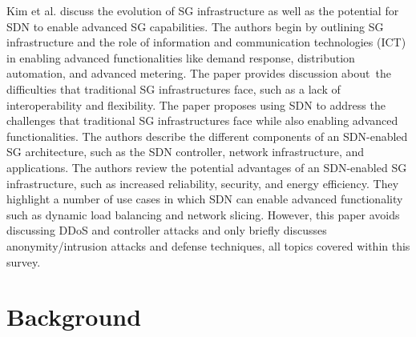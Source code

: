 \documentclass[conference]{IEEEtran}
\begin{document}
Kim et al. \cite{kim2015trends} discuss the evolution of SG infrastructure as well as the potential for SDN to enable advanced SG capabilities. The authors begin by outlining SG infrastructure and the role of information and communication technologies (ICT) in enabling advanced functionalities like demand response, distribution automation, and advanced metering. The paper provides discussion about the difficulties that traditional SG infrastructures face, such as a lack of interoperability and flexibility. The paper proposes using SDN to address the challenges that traditional SG infrastructures face while also enabling advanced functionalities. The authors describe the different components of an SDN-enabled SG architecture, such as the SDN controller, network infrastructure, and applications. The authors review the potential advantages of an SDN-enabled SG infrastructure, such as increased reliability, security, and energy efficiency. They highlight a number of use cases in which SDN can enable advanced functionality such as dynamic load balancing and network slicing. However, this paper avoids discussing DDoS and controller attacks and only briefly discusses anonymity/intrusion attacks and defense techniques, all topics covered within this survey.










\section{Background}
\label{Background}
\end{document}

